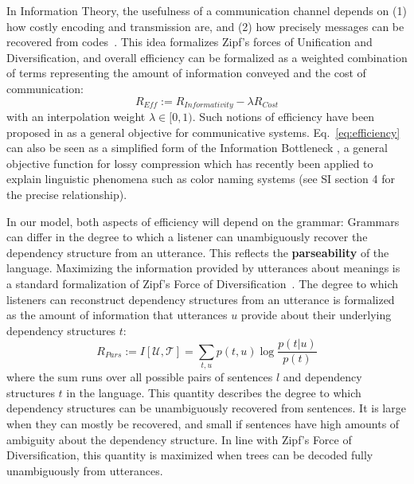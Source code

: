 \documentclass[9pt,twocolumn,twoside,lineno]{pnas-new}
\newcommand{\key}[1]{\textbf{#1}}
\begin{document}


In Information Theory, the usefulness of a communication channel depends on (1) how costly encoding and transmission are, and (2) how precisely messages can be recovered from codes~\cite{shannon1948mathematical}.
This idea formalizes Zipf's forces of Unification and Diversification, and overall efficiency can be formalized as a weighted combination of terms representing the amount of information conveyed and the cost of communication:
\begin{equation}\label{eq:efficiency}
	R_{\textit{Eff}} := R_{\textit{Informativity}} - \lambda R_\textit{Cost}
\end{equation}
with an interpolation weight $\lambda \in [0,1)$. %
Such notions of efficiency have been proposed in \cite{ferrericancho2002zipf,ferrericancho2007global,futrell2017memory} as a general objective for communicative systems. %
Eq.~\ref{eq:efficiency} can also be seen as a simplified form of the Information Bottleneck \cite{tishby1999information}, a general objective function for lossy compression which has recently been applied to explain linguistic phenomena such as color naming systems \cite{zaslavsky2018efficient} (see SI section 4 for the precise relationship). 


In our model, both aspects of efficiency will depend on the grammar:
Grammars can differ in the degree to which a listener can unambiguously recover the dependency structure from an utterance.
This reflects the \key{parseability} of the language.
Maximizing the information provided by utterances about meanings is a standard formalization of Zipf's Force of Diversification~\cite{frank2012predicting,regier2015word}. %
The degree to which listeners can reconstruct dependency structures from an utterance is formalized as the amount of information that utterances $u$ provide about their underlying dependency structures $t$:
\begin{equation}
	R_{Pars} := I[\mathcal{U},\mathcal{T}] = \sum_{t,u} p(t,u) \log \frac{p(t|u)}{p(t)}
\end{equation}
where the sum runs over all possible pairs of sentences $l$ and dependency structures $t$ in the language.
This quantity describes the degree to which dependency structures can be unambiguously recovered from sentences.
It is large when they can mostly be recovered, and small if sentences have high amounts of ambiguity about the dependency structure.
In line with Zipf's Force of Diversification, this quantity is maximized when trees can be decoded fully unambiguously from utterances.
\end{document}
